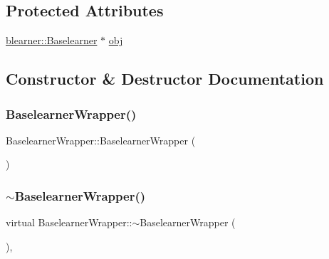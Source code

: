 \subsection*{Protected Attributes}
\begin{DoxyCompactItemize}
\item 
\mbox{\hyperlink{classblearner_1_1_baselearner}{blearner\+::\+Baselearner}} $\ast$ \mbox{\hyperlink{class_baselearner_wrapper_a4c0fc84b4a0d10d9353a263fbec92d22}{obj}}
\end{DoxyCompactItemize}


\subsection{Constructor \& Destructor Documentation}
\mbox{\label{class_baselearner_wrapper_a949efebe239360548b02a211b649d6d8}} 
\subsubsection{\texorpdfstring{Baselearner\+Wrapper()}{BaselearnerWrapper()}}
{\footnotesize\ttfamily Baselearner\+Wrapper\+::\+Baselearner\+Wrapper (\begin{DoxyParamCaption}{ }\end{DoxyParamCaption})\hspace{0.3cm}{\ttfamily [inline]}}

\mbox{\label{class_baselearner_wrapper_a2dcf0b1a75179c3a2104b70138f88dc7}} 
\subsubsection{\texorpdfstring{$\sim$\+Baselearner\+Wrapper()}{~BaselearnerWrapper()}}
{\footnotesize\ttfamily virtual Baselearner\+Wrapper\+::$\sim$\+Baselearner\+Wrapper (\begin{DoxyParamCaption}{ }\end{DoxyParamCaption})\hspace{0.3cm}{\ttfamily [inline]}, {\ttfamily [virtual]}}



